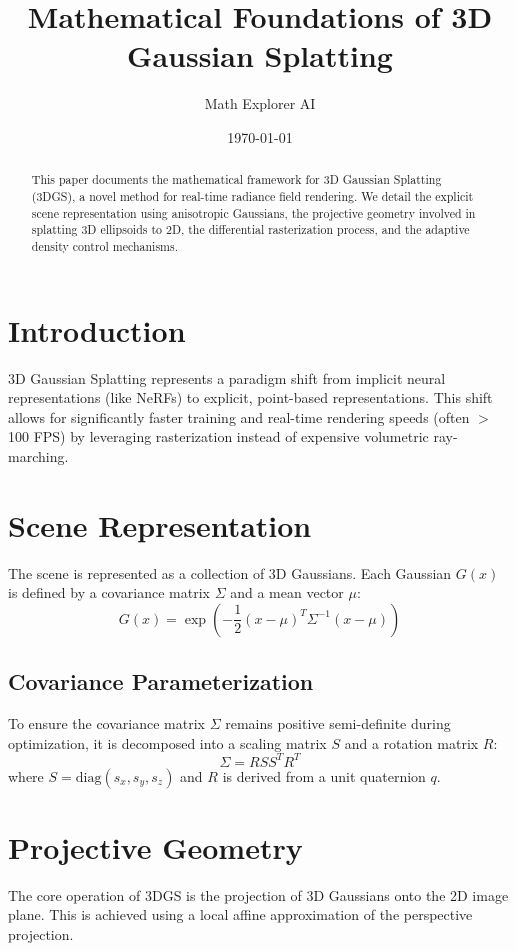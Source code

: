 \documentclass{article}
\title{Mathematical Foundations of 3D Gaussian Splatting}
\author{Math Explorer AI}
\date{\today}
\begin{document}
\maketitle

\begin{abstract}
This paper documents the mathematical framework for 3D Gaussian Splatting (3DGS), a novel method for real-time radiance field rendering. We detail the explicit scene representation using anisotropic Gaussians, the projective geometry involved in splatting 3D ellipsoids to 2D, the differential rasterization process, and the adaptive density control mechanisms.
\end{abstract}

\section{Introduction}
3D Gaussian Splatting represents a paradigm shift from implicit neural representations (like NeRFs) to explicit, point-based representations. This shift allows for significantly faster training and real-time rendering speeds (often $>$ 100 FPS) by leveraging rasterization instead of expensive volumetric ray-marching.

\section{Scene Representation}
The scene is represented as a collection of 3D Gaussians. Each Gaussian $G(x)$ is defined by a covariance matrix $\Sigma$ and a mean vector $\mu$:
\begin{equation}
G(x) = \exp\left(-\frac{1}{2} (x - \mu)^T \Sigma^{-1} (x - \mu)\right)
\end{equation}

\subsection{Covariance Parameterization}
To ensure the covariance matrix $\Sigma$ remains positive semi-definite during optimization, it is decomposed into a scaling matrix $S$ and a rotation matrix $R$:
\begin{equation}
\Sigma = R S S^T R^T
\end{equation}
where $S = \text{diag}(s_x, s_y, s_z)$ and $R$ is derived from a unit quaternion $q$.

\section{Projective Geometry}
The core operation of 3DGS is the projection of 3D Gaussians onto the 2D image plane. This is achieved using a local affine approximation of the perspective projection.
\end{document}
